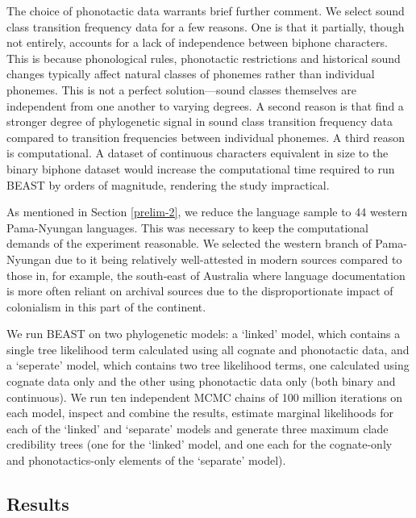 \documentclass[]{article}
\begin{document}
The choice of phonotactic data warrants brief further comment. We select sound class transition frequency data for a few reasons. One is that it partially, though not entirely, accounts for a lack of independence between biphone characters. This is because phonological rules, phonotactic restrictions and historical sound changes typically affect natural classes of phonemes rather than individual phonemes. This is not a perfect solution---sound classes themselves are independent from one another to varying degrees. A second reason is that \textcite{macklin-cordes_phylogenetic_2020} find a stronger degree of phylogenetic signal in sound class transition frequency data compared to transition frequencies between individual phonemes. A third reason is computational. A dataset of continuous characters equivalent in size to the binary biphone dataset would increase the computational time required to run BEAST by orders of magnitude, rendering the study impractical.

As mentioned in Section \ref{prelim-2}, we reduce the language sample to 44 western Pama-Nyungan languages. This was necessary to keep the computational demands of the experiment reasonable. We selected the western branch of Pama-Nyungan due to it being relatively well-attested in modern sources compared to those in, for example, the south-east of Australia where language documentation is more often reliant on archival sources due to the disproportionate impact of colonialism in this part of the continent.

We run BEAST on two phylogenetic models: a `linked' model, which contains a single tree likelihood term calculated using all cognate and phonotactic data, and a `seperate' model, which contains two tree likelihood terms, one calculated using cognate data only and the other using phonotactic data only (both binary and continuous). We run ten independent MCMC chains of 100 million iterations on each model, inspect and combine the results, estimate marginal likelihoods for each of the `linked' and `separate' models and generate three maximum clade credibility trees (one for the `linked' model, and one each for the cognate-only and phonotactics-only elements of the `separate' model).

\hypertarget{main-results}{%
\subsection{Results}\label{main-results}}
\end{document}
